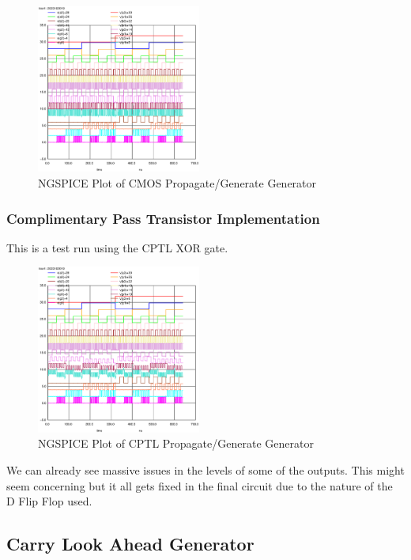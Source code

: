 \documentclass[conference]{IEEEtran}
\begin{document}
\begin{figure}[H]
    \centering
    \includegraphics[width=0.48\textwidth]{images/pg_gen_cmos_tran.eps}
    \caption{NGSPICE Plot of CMOS Propagate/Generate Generator}
\end{figure}

\subsubsection{Complimentary Pass Transistor Implementation}

This is a test run using the CPTL XOR gate.

\begin{figure}[H]
    \centering
    \includegraphics[width=0.48\textwidth]{images/pg_gen_optimized_tran.eps}
    \caption{NGSPICE Plot of CPTL Propagate/Generate Generator}
\end{figure}

We can already see massive issues in the levels of some of the outputs. This might seem concerning but it all gets fixed in the final circuit due to the nature of the D Flip Flop used.

\subsection{Carry Look Ahead Generator}
\end{document}
